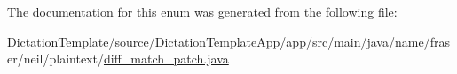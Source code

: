 The documentation for this enum was generated from the following file\+:\begin{DoxyCompactItemize}
\item 
Dictation\+Template/source/\+Dictation\+Template\+App/app/src/main/java/name/fraser/neil/plaintext/\hyperlink{diff__match__patch_8java}{diff\+\_\+match\+\_\+patch.\+java}\end{DoxyCompactItemize}
